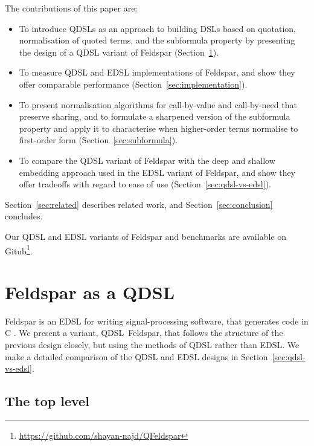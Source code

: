 \documentclass[authoryear,9pt]{sigplanconf}
\begin{document}
The contributions of this paper are:
\begin{itemize}

\item To introduce QDSLs as an approach to building DSLs based on
  quotation, normalisation of quoted terms, and the subformula property
  by presenting the design of a QDSL variant of Feldspar
  (Section~\ref{sec:qfeldspar}).

\item To measure QDSL and EDSL implementations of Feldspar,
  and show they offer comparable performance
  (Section~\ref{sec:implementation}).

\item To present normalisation algorithms for
  call-by-value and call-by-need that preserve sharing, and to
  formulate a sharpened version of the subformula property and apply
  it to characterise when higher-order terms normalise to first-order
  form (Section~\ref{sec:subformula}).

\item To compare the QDSL variant of Feldspar with the deep and
  shallow embedding approach used in the EDSL variant of Feldspar,
  and show they offer tradeoffs with regard to ease of use
  (Section~\ref{sec:qdsl-vs-edsl}).

\end{itemize}
Section~\ref{sec:related} describes related work, and
Section~\ref{sec:conclusion} concludes.

Our QDSL and EDSL variants of Feldspar and benchmarks are
available on Gitub\footnote{\url{https://github.com/shayan-najd/QFeldspar}}.


\section{Feldspar as a QDSL}
\label{sec:qfeldspar}

Feldspar is an EDSL for writing signal-processing software, that
generates code in C \citep{FELDSPAR}. We present a variant,
QDSL~Feldspar, that follows the structure of the previous design closely,
but using the methods of QDSL rather than EDSL. We make a detailed
comparison of the QDSL and EDSL designs in Section~\ref{sec:qdsl-vs-edsl}.


\subsection{The top level}
\label{subsec:top}
\end{document}

